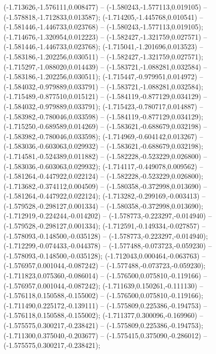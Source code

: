  (-1.713626,-1.576111,0.008477) -- (-1.580243,-1.577113,0.019105) -- (-1.578818,-1.712833,0.013587);
 (-1.714205,-1.445768,0.010541) -- (-1.581446,-1.446733,0.023768) -- (-1.580243,-1.577113,0.019105);
 (-1.714676,-1.320954,0.012223) -- (-1.582427,-1.321759,0.027571) -- (-1.581446,-1.446733,0.023768);
 (-1.715041,-1.201696,0.013523) -- (-1.583186,-1.202256,0.030511) -- (-1.582427,-1.321759,0.027571);
 (-1.715297,-1.088020,0.014439) -- (-1.583721,-1.088281,0.032584) -- (-1.583186,-1.202256,0.030511);
 (-1.715447,-0.979951,0.014972) -- (-1.584032,-0.979889,0.033791) -- (-1.583721,-1.088281,0.032584);
 (-1.715489,-0.877510,0.015121) -- (-1.584119,-0.877129,0.034129) -- (-1.584032,-0.979889,0.033791);
 (-1.715423,-0.780717,0.014887) -- (-1.583982,-0.780046,0.033598) -- (-1.584119,-0.877129,0.034129);
 (-1.715250,-0.689589,0.014269) -- (-1.583621,-0.688679,0.032198) -- (-1.583982,-0.780046,0.033598);
 (-1.714969,-0.604142,0.013267) -- (-1.583036,-0.603063,0.029932) -- (-1.583621,-0.688679,0.032198);
 (-1.714581,-0.524389,0.011882) -- (-1.582228,-0.523229,0.026800) -- (-1.583036,-0.603063,0.029932);
 (-1.714117,-0.449078,0.009562) -- (-1.581264,-0.447922,0.022124) -- (-1.582228,-0.523229,0.026800);
 (-1.713682,-0.374112,0.004509) -- (-1.580358,-0.372998,0.013690) -- (-1.581264,-0.447922,0.022124);
 (-1.713282,-0.299169,-0.003413) -- (-1.579528,-0.298127,0.001334) -- (-1.580358,-0.372998,0.013690);
 (-1.712919,-0.224244,-0.014202) -- (-1.578773,-0.223297,-0.014940) -- (-1.579528,-0.298127,0.001334);
 (-1.712591,-0.149334,-0.027857) -- (-1.578093,-0.148500,-0.035128) -- (-1.578773,-0.223297,-0.014940);
 (-1.712299,-0.074433,-0.044378) -- (-1.577488,-0.073723,-0.059230) -- (-1.578093,-0.148500,-0.035128);
 (-1.712043,0.000464,-0.063763) -- (-1.576957,0.001044,-0.087242) -- (-1.577488,-0.073723,-0.059230);
 (-1.711823,0.075360,-0.086014) -- (-1.576500,0.075810,-0.119166) -- (-1.576957,0.001044,-0.087242);
 (-1.711639,0.150261,-0.111130) -- (-1.576118,0.150588,-0.155002) -- (-1.576500,0.075810,-0.119166);
 (-1.711490,0.225172,-0.139111) -- (-1.575809,0.225386,-0.194753) -- (-1.576118,0.150588,-0.155002);
 (-1.711377,0.300096,-0.169960) -- (-1.575575,0.300217,-0.238421) -- (-1.575809,0.225386,-0.194753);
 (-1.711300,0.375040,-0.203677) -- (-1.575415,0.375090,-0.286012) -- (-1.575575,0.300217,-0.238421);
